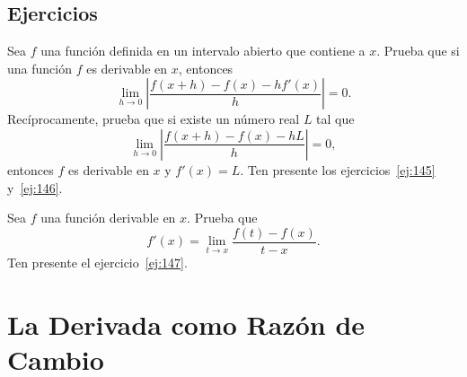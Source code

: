 \documentclass[12pt,a4paper]{book}
\begin{document}
    \par{}\subsection*{Ejercicios}

    \begin{ejercicio}\label{ej:230}
        Sea $f$ una función definida en un intervalo abierto que
        contiene a $x$. Prueba que si una función $f$ es derivable en $x$, entonces
        \begin{equation*}
            \lim_{h\to 0}\left|\frac{f(x+h)-f(x)-hf'(x)}{h}\right|=0.
        \end{equation*}
        Recíprocamente, prueba que si existe un número real $L$ tal que
        \begin{equation*}
            \lim_{h\to 0}\left|\frac{f(x+h)-f(x)-hL}{h}\right|=0,
        \end{equation*}
        entonces $f$ es derivable en $x$ y $f'(x)=L$. \sugerencia Ten presente los
        ejercicios~\ref{ej:145} y~\ref{ej:146}.
    \end{ejercicio}

    \begin{ejercicio}\label{ej:231}
        Sea $f$ una función derivable en $x$. Prueba que
        \begin{equation*}
            f'(x)=\lim_{t\to x}\frac{f(t)-f(x)}{t-x}.
        \end{equation*}
        \sugerencia Ten presente el ejercicio~\ref{ej:147}.
    \end{ejercicio}

    \section{La Derivada como Razón de Cambio}
\end{document}
